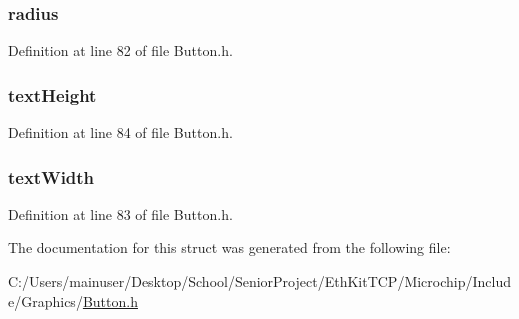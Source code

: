 \subsubsection[{radius}]{ radius}\label{struct_b_u_t_t_o_n_ae5bf5300978dec1b6c69ee537e1c98f8}


Definition at line 82 of file Button.\+h.

\hypertarget{struct_b_u_t_t_o_n_a40fa9c35391b0005032180b85e7afd34}{}
\subsubsection[{text\+Height}]{ text\+Height}\label{struct_b_u_t_t_o_n_a40fa9c35391b0005032180b85e7afd34}


Definition at line 84 of file Button.\+h.

\hypertarget{struct_b_u_t_t_o_n_a9fbde8f74d930599fd9206a263e46cd6}{}
\subsubsection[{text\+Width}]{ text\+Width}\label{struct_b_u_t_t_o_n_a9fbde8f74d930599fd9206a263e46cd6}


Definition at line 83 of file Button.\+h.



The documentation for this struct was generated from the following file\+:\begin{DoxyCompactItemize}
\item 
C\+:/\+Users/mainuser/\+Desktop/\+School/\+Senior\+Project/\+Eth\+Kit\+T\+C\+P/\+Microchip/\+Include/\+Graphics/\hyperlink{_button_8h}{Button.\+h}\end{DoxyCompactItemize}
